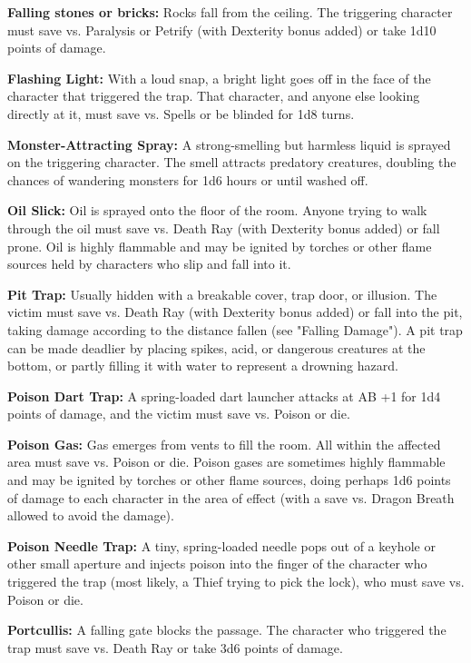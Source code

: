 \documentclass[a4paper,twoside,openany,10pt]{book}
\begin{document}
\begin{multicols}{2}
\textbf{Falling stones or bricks:} Rocks fall from the ceiling. The triggering character must save vs. Paralysis or Petrify (with Dexterity bonus added) or take 1d10 points of damage. 

\textbf{Flashing Light:} With a loud snap, a bright light goes off in the face of the character that triggered the trap. That character, and anyone else looking directly at it, must save vs. Spells or be blinded for 1d8 turns.

\textbf{Monster-Attracting Spray:} A strong-smelling but harmless liquid is sprayed on the triggering character. The smell attracts predatory creatures, doubling the chances of wandering monsters for 1d6 hours or until washed off.

\textbf{Oil Slick:} Oil is sprayed onto the floor of the room. Anyone trying to walk through the oil must save vs. Death Ray (with Dexterity bonus added) or fall prone. Oil is highly flammable and may be ignited by torches or other flame sources held by characters who slip and fall into it.

\textbf{Pit Trap:} Usually hidden with a breakable cover, trap door, or illusion. The victim must save vs. Death Ray (with Dexterity bonus added) or fall into the pit, taking damage according to the distance fallen (see "Falling Damage"). A pit trap can be made deadlier by placing spikes, acid, or dangerous creatures at the bottom, or partly filling it with water to represent a drowning hazard.

\textbf{Poison Dart Trap:} A spring-loaded dart launcher attacks at AB +1 for 1d4 points of damage, and the victim must save vs. Poison or die.

\textbf{Poison Gas:} Gas emerges from vents to fill the room. All within the affected area must save vs. Poison or die. Poison gases are sometimes highly flammable and may be ignited by torches or other flame sources, doing perhaps 1d6 points of damage to each character in the area of effect (with a save vs. Dragon Breath allowed to avoid the damage).

\textbf{Poison Needle Trap:} A tiny, spring-loaded needle pops out of a keyhole or other small aperture and injects poison into the finger of the character who triggered the trap (most likely, a Thief trying to pick the lock), who must save vs. Poison or die.

\textbf{Portcullis:} A falling gate blocks the passage. The character who triggered the trap must save vs. Death Ray or take 3d6 points of damage.


\end{multicols}
\end{document}
